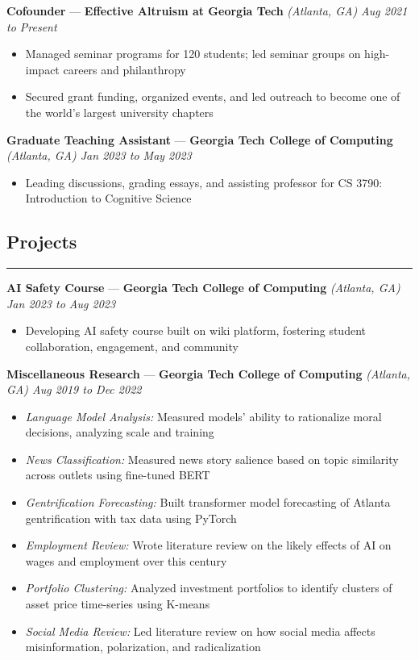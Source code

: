 \documentclass[10pt]{article}
\newcommand{\resumeHeading}[1]{
    \subsection*{#1}
    \hrule
    \vspace*{5pt}
}
\newcommand{\resumeSubHeading}[4]{
    \vspace*{5pt}
    \textbf{#1} — \textbf{#2} \textsl{(#3) \hfill #4}
}
\begin{document}
\resumeSubHeading
    {Cofounder}
    {Effective Altruism at Georgia Tech}
    {Atlanta, GA}
    {Aug 2021 to Present}
\begin{itemize}
    \item Managed seminar programs for 120 students; led seminar groups on high-impact careers and philanthropy
    \item Secured grant funding, organized events, and led outreach to become one of the world's largest university chapters
\end{itemize}

\resumeSubHeading
    {Graduate Teaching Assistant}
    {Georgia Tech College of Computing}
    {Atlanta, GA}
    {Jan 2023 to May 2023}
\begin{itemize}
    \item Leading discussions, grading essays, and assisting professor for CS 3790: Introduction to Cognitive Science
\end{itemize}



\resumeHeading{Projects \vspace{-2.5pt}}

\resumeSubHeading
    {AI Safety Course}
    {Georgia Tech College of Computing}
    {Atlanta, GA}
    {Jan 2023 to Aug 2023}
\begin{itemize}
    \item Developing AI safety course built on wiki platform, fostering student collaboration, engagement, and community
\end{itemize}

\resumeSubHeading
    {Miscellaneous Research}
    {Georgia Tech College of Computing}
    {Atlanta, GA}
    {Aug 2019 to Dec 2022}
\begin{itemize}
    \item \emph{Language Model Analysis:}
        Measured models' ability to rationalize moral decisions, analyzing scale and training
    \item \emph{News Classification:}
        Measured news story salience based on topic similarity across outlets using fine-tuned BERT
    \item \emph{Gentrification Forecasting:}
        Built transformer model forecasting of Atlanta gentrification with tax data using PyTorch
    \item \emph{Employment Review:}
        Wrote literature review on the likely effects of AI on wages and employment over this century
    \item \emph{Portfolio Clustering:}
        Analyzed investment portfolios to identify clusters of asset price time-series using K-means
    \item \emph{Social Media Review:}
        Led literature review on how social media affects misinformation, polarization, and radicalization
\end{itemize}
\end{document}
